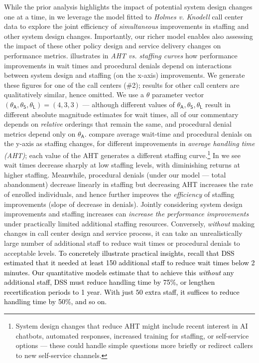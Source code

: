 \documentclass[manuscript,screen,authorversion]{acmart}
\newcommand{\rev}[1]{\textcolor{black}{#1}}
\begin{document}
While the prior analysis highlights the impact of potential system design changes one at a time, in  we leverage the model fitted to \textit{Holmes v. Knodell} call center data to explore the joint efficiency of \textit{simultaneous} improvements in staffing and other system design changes. Importantly, our richer model enables also assessing the impact of these other policy design and service delivery changes on performance metrics.  illustrates in \textit{AHT vs. staffing curves} how performance improvements in wait times and procedural denials depend on interactions between system design and staffing (on the x-axis) improvements. We generate these figures for one of the call centers (\#2); results for other call centers are qualitatively similar, hence omitted. We use a $\theta$ parameter vector $(\theta_{\mathsf{A}}, \theta_{\mathsf{S}},\theta_{\mathsf{L}}) =(4,3,3)$ --- although different values of $\theta_{\mathsf{A}}, \theta_{\mathsf{S}},\theta_{\mathsf{L}}$ result in different absolute magnitude estimates for wait times, all of our commentary depends on \textit{relative} orderings that remain the same, and procedural denial metrics depend only on $\theta_{\mathsf{A}}.$  compare average wait-time and procedural denials on the y-axis as staffing changes, for different improvements in \textit{average handling time (AHT)}; each value of the AHT generates a different staffing curve.\footnote{System design changes that reduce AHT might include recent interest in AI chatbots, automated responses, increased training for staffing, or self-service options --- these could handle simple questions more briefly or redirect callers to new self-service channels.} In  we see wait times decrease sharply at low staffing levels, with diminishing returns at higher staffing. Meanwhile, procedural denials (under our model --- total abandonment) decrease linearly in staffing but decreasing AHT increases the rate of enrolled individuals, and hence further improves the \textit{efficiency} of staffing improvements (slope of decrease in denials). Jointly considering system design improvements and staffing increases can \textit{increase the performance improvements} under practically limited additional staffing resources. Conversely, \textit{without} making changes in call center design and service process, it can take an unrealistically large number of additional staff to reduce wait times or procedural denials to acceptable levels. \rev{To concretely illustrate practical insights, recall that DSS estimated that it needed at least 150 additional staff to reduce wait times below 2 minutes. Our quantitative models estimate that to achieve this \textit{without} any additional staff, DSS must reduce handling time by 75\%, or lengthen recertification periods to 1 year. With just $50$ extra staff, it suffices to reduce handling time by 50\%, and so on.} %
\end{document}
